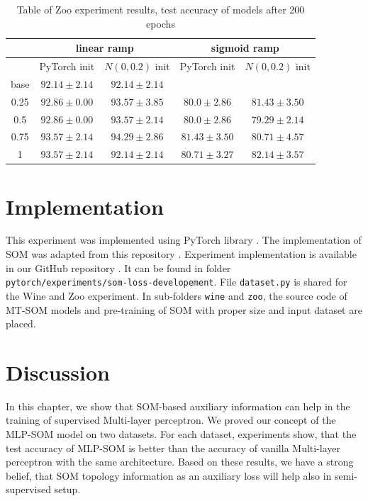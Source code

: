 \begin{table}[h!]
\centering
\begin{tabular}{|c|cc|cc|}
\hline
     & \multicolumn{2}{c|}{linear ramp} & \multicolumn{2}{c|}{sigmoid ramp} \\ \hline
 & \multicolumn{1}{c|}{PyTorch init} & $N(0, 0.2)$ init & \multicolumn{1}{c|}{PyTorch init} & $N(0, 0.2)$ init \\ \hline
base  & \multicolumn{1}{c|}{$92.14\pm 2.14$}    &   $92.14\pm 2.14$   & \multicolumn{1}{c|}{}      &       \\ \hline
0.25  & \multicolumn{1}{c|}{$92.86\pm 0.00$}     &   $93.57\pm 3.85$   & \multicolumn{1}{c|}{$80.0	\pm 2.86$}      &  $81.43\pm 3.50$     \\ \hline
 0.5  & \multicolumn{1}{c|}{$92.86\pm 0.00$}     &   $93.57\pm 2.14$   & \multicolumn{1}{c|}{$80.0	\pm 2.86$}      &  $79.29\pm 2.14$    \\ \hline
0.75  & \multicolumn{1}{c|}{$93.57\pm 2.14$}    &  $94.29\pm 2.86$    & \multicolumn{1}{c|}{$81.43	\pm 3.50$}      &   $80.71\pm 4.57$    \\ \hline
   1  & \multicolumn{1}{c|}{$93.57	\pm 2.14$}   &  $92.14\pm 2.14$    & \multicolumn{1}{c|}{ $80.71	\pm 3.27$}      &   $82.14	\pm 3.57$     \\ \hline

\end{tabular}
\caption{Table of Zoo experiment results, test accuracy of models after 200 epochs}
\label{tab:zoo}
\end{table}

\section{Implementation}
This experiment was implemented using PyTorch library \cite{pytorch}. The implementation of SOM was adapted from this repository \cite{som-repo}. Experiment implementation is available in our GitHub repository \cite{dt-mt-repo}. It can be found in folder \\ \texttt{pytorch/experiments/som-loss-developement}. File \texttt{dataset.py} is shared for the Wine and Zoo experiment. In sub-folders \texttt{wine} and \texttt{zoo}, the source code of MT-SOM models and pre-training of SOM with proper size and input dataset are placed. 

\section{Discussion}
In this chapter, we show that SOM-based auxiliary information can help in the training of supervised Multi-layer perceptron. We proved our concept of the MLP-SOM model on two datasets. For each dataset, experiments show, that the test accuracy of MLP-SOM is better than the accuracy of vanilla Multi-layer perceptron with the same architecture. Based on these results, we have a strong belief, that SOM topology information as an auxiliary loss will help also in semi-supervised setup.